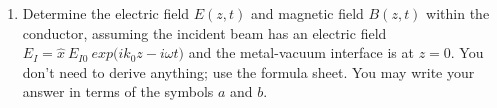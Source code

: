 \documentclass[fleqn]{article}
\begin{document}
\begin{enumerate}
\begin{enumerate}

      \item Determine the electric field $E(z,t)$ and magnetic field $B(z,t)$ within the conductor, assuming
      the incident beam has an electric field $E_I= \hat{x} ~ E_{I0} ~ exp \bigg( i k_0 z - i \omega t \bigg)$ 
      and the metal-vacuum interface is at $z = 0$. You don't need to derive anything; use the formula sheet. 
      You may write your answer in terms of the symbols $a$ and $b$.


    \end{enumerate}

  \end{enumerate}
\end{document}
